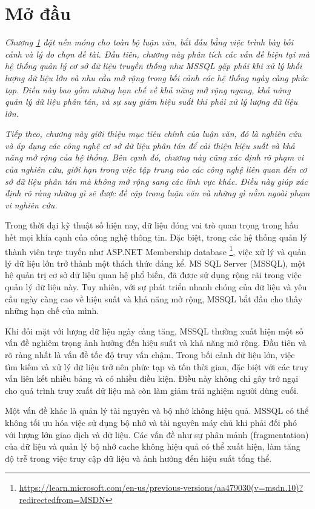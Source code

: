 

\section{Mở đầu}
\label{sec:introduction}

\textit{Chương \ref{sec:introduction} đặt nền móng cho toàn bộ luận văn, bắt đầu bằng việc trình bày bối cảnh và lý do chọn đề tài. Đầu tiên, chương này phân tích các vấn đề hiện tại mà hệ thống quản lý cơ sở dữ liệu truyền thống như MSSQL gặp phải khi xử lý khối lượng dữ liệu lớn và nhu cầu mở rộng trong bối cảnh các hệ thống ngày càng phức tạp. Điều này bao gồm những hạn chế về khả năng mở rộng ngang, khả năng quản lý dữ liệu phân tán, và sự suy giảm hiệu suất khi phải xử lý lượng dữ liệu lớn.}

\textit{Tiếp theo, chương này giới thiệu mục tiêu chính của luận văn, đó là nghiên cứu và áp dụng các công nghệ cơ sở dữ liệu phân tán để cải thiện hiệu suất và khả năng mở rộng của hệ thống. Bên cạnh đó, chương này cũng xác định rõ phạm vi của nghiên cứu, giới hạn trong việc tập trung vào các công nghệ liên quan đến cơ sở dữ liệu phân tán mà không mở rộng sang các lĩnh vực khác. Điều này giúp xác định rõ ràng những gì sẽ được đề cập trong luận văn và những gì nằm ngoài phạm vi nghiên cứu.}


Trong thời đại kỹ thuật số hiện nay, dữ liệu đóng vai trò quan trọng trong hầu hết mọi khía cạnh của công nghệ thông tin. Đặc biệt, trong các hệ thống quản lý thành viên trực tuyến như ASP.NET Membership database \footnote{\url{https://learn.microsoft.com/en-us/previous-versions/aa479030(v=msdn.10)?redirectedfrom=MSDN}}, việc xử lý và quản lý dữ liệu lớn trở thành một thách thức đáng kể. MS SQL Server (MSSQL), một hệ quản trị cơ sở dữ liệu quan hệ phổ biến, đã được sử dụng rộng rãi trong việc quản lý dữ liệu này. Tuy nhiên, với sự phát triển nhanh chóng của dữ liệu và yêu cầu ngày càng cao về hiệu suất và khả năng mở rộng, MSSQL bắt đầu cho thấy những hạn chế của mình.

Khi đối mặt với lượng dữ liệu ngày càng tăng, MSSQL thường xuất hiện một số vấn đề nghiêm trọng ảnh hưởng đến hiệu suất và khả năng mở rộng. Đầu tiên và rõ ràng nhất là vấn đề tốc độ truy vấn chậm. Trong bối cảnh dữ liệu lớn, việc tìm kiếm và xử lý dữ liệu trở nên phức tạp và tốn thời gian, đặc biệt với các truy vấn liên kết nhiều bảng và có nhiều điều kiện. Điều này không chỉ gây trở ngại cho quá trình truy xuất dữ liệu mà còn làm giảm trải nghiệm người dùng cuối.

Một vấn đề khác là quản lý tài nguyên và bộ nhớ không hiệu quả. MSSQL có thể không tối ưu hóa việc sử dụng bộ nhớ và tài nguyên máy chủ khi phải đối phó với lượng lớn giao dịch và dữ liệu. Các vấn đề như sự phân mảnh (fragmentation) của dữ liệu và quản lý bộ nhớ cache không hiệu quả có thể xuất hiện, làm tăng độ trễ trong việc truy cập dữ liệu và ảnh hưởng đến hiệu suất tổng thể.

